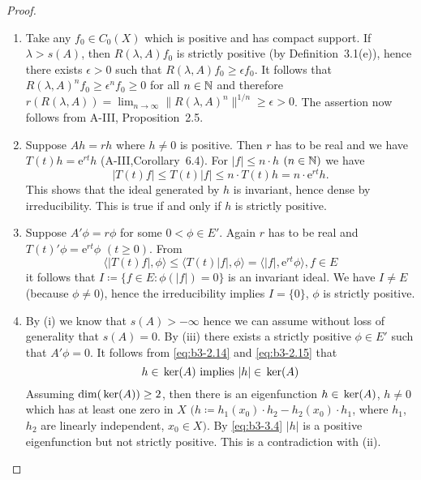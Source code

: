\begin{proof} 
\begin{enumerate}[\upshape (i), wide, labelindent=.5em]
	\item 
	Take any $f_{0} \in C_{0}(X)$ which is positive and has compact support.
	If $\lambda > s(A)$, then $R(\lambda,A)f_{0}$ is strictly positive (by Definition~3.1(e)), hence there exists $\epsilon > 0$ such that $R(\lambda,A)f_{0} \geq \epsilon f_{0}$.
	It follows that $R(\lambda,A)^nf_{0} \geq \epsilon^nf_{0} \geq 0$ for all $n \in \mathbb{N}$ and therefore
	$r(R(\lambda,A)) = \lim_{n \to \infty}\|R(\lambda,A)^{n}\|^{1/n} \geq \epsilon > 0 $.
	The assertion now follows from A-III, Proposition~2.5.	

	\item 
	Suppose $Ah = rh$ where $h \neq 0$ is positive.
	Then $r$ has to be real and we have $T(t)h = \mathrm{e}^{rt}h$ (A-III,Corollary~6.4).
	For $|f| \leq n\cdot h$ $(n \in \mathbb{N})$ we have
	\begin{equation}\label{eq:b3-3.2}
		|T(t)f| \leq T(t)|f| \leq n\cdot T(t)h = n\cdot \mathrm{e}^{rt}h.		
	\end{equation}
		This shows that the ideal generated by $h$ is invariant, hence dense by irreducibility.
	This is true if and only if $h$ is strictly positive.
	
	\item 
	Suppose $A'\phi = r\phi$ for some $0 < \phi \in E'$.
	Again $r$ has to be real and $T(t)'\phi = \mathrm{e}^{rt}\phi$ $(t \geq 0)$.
	From
	\begin{equation}\label{eq:b3-3.3}
	\langle|T(t)f|,\phi\rangle \leq \langle T(t)|f|,\phi\rangle = \langle|f|,\mathrm{e}^{rt}\phi\rangle, f \in E			
	\end{equation}
	it follows that $I \coloneq \{f \in E \colon \phi(|f|) = 0\}$ is an invariant ideal.
	We have $I \neq E$ (because $\phi \neq 0$), hence the irreducibility implies $I = \{0\}$, \ie $\phi$ is strictly positive.
	
	\item 
	By (i) we know that $s(A) > -\infty$ hence we can assume without loss of generality that $s(A) = 0$.
	By (iii) there exists a strictly positive $\phi \in E'$ such that $A'\phi = 0$.
	It follows from \eqref{eq:b3-2.14} and \eqref{eq:b3-2.15} that
	\begin{equation}\label{eq:b3-3.4}
	h \in \mathop{}\mathrm{ker}(A) \text{ implies } |h| \in \mathop{}\mathrm{ker}(A)
	\end{equation}
	Assuming $\dim(\mathop{}\mathrm{ker}(A)) \geq 2$, then there is an eigenfunction $h \in \mathop{}\mathrm{ker}(A)$, $h \neq 0$ which has at least one zero in $X$ $(h \coloneq h_{1}(x_{0})\cdot h_{2} - h_{2}(x_{0})\cdot h_{1}$, where $h_{1}$, $h_{2}$ are linearly independent, $x_{0} \in X)$.
	By \eqref{eq:b3-3.4} $|h|$ is a positive eigenfunction but not strictly positive.
	This is a contradiction with (ii).
	

\end{enumerate}
\end{proof}
